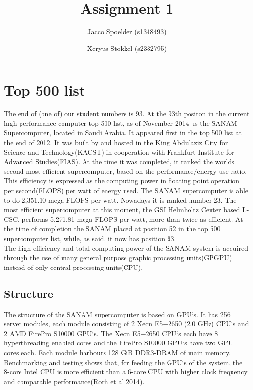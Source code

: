 \documentclass[a4paper]{article}
\title{Assignment 1}
\author{Jacco Spoelder (s1348493) \and Xeryus Stokkel (s2332795)}
\begin{document}
\maketitle

\section{Top 500 list}
The end of (one of) our student numbers is 93. At the 93th positon in the current high performance computer top 500 list, as of November 2014, is the SANAM Supercomputer, located in Saudi Arabia. It appeared first in the top 500 list at the end of 2012. It was built by and hosted in the King Abdulaziz City for Science and Technology(KACST) in cooperation with Frankfurt Institute for Advanced Studies(FIAS). At the time it was completed, it ranked the worlds second most efficient supercomputer, based on the performance/energy use ratio. This efficiency is expressed as the computing power in floating point operation per second(FLOPS) per watt of energy used. The SANAM supercomputer is able to do 2,351.10 mega FLOPS per watt. Nowadays it is ranked number 23. The most efficient supercomputer at this moment, the GSI Helmholtz Center based L-CSC, performs 5,271.81 mega FLOPS per watt, more than twice as efficient. At the time of completion the SANAM placed at position 52 in the top 500 supercomputer list, while, as said, it now has position 93. 
\\
The high efficiency and total computing power of the SANAM system is acquired through the use of many general purpose graphic processing units(GPGPU) instead of only central processing units(CPU).
\subsection{Structure}
The structure of the SANAM supercomputer is based on GPU`s. It has 256 server modules, each module consisting of 2 Xeon E5−2650 (2.0 GHz) CPU`s and 2 AMD FirePro S10000 GPU`s. The Xeon E5−2650 CPU`s each have 8 hyperthreading enabled cores and the FirePro S10000 GPU`s have two GPU cores each. Each module harbours 128 GiB DDR3-DRAM of main memory. Benchmarking and testing shows that, for feeding the GPU`s of the system, the 8-core Intel CPU is more efficient than a 6-core CPU with higher clock frequency and comparable performance(Rorh et al 2014).
\end{document}
